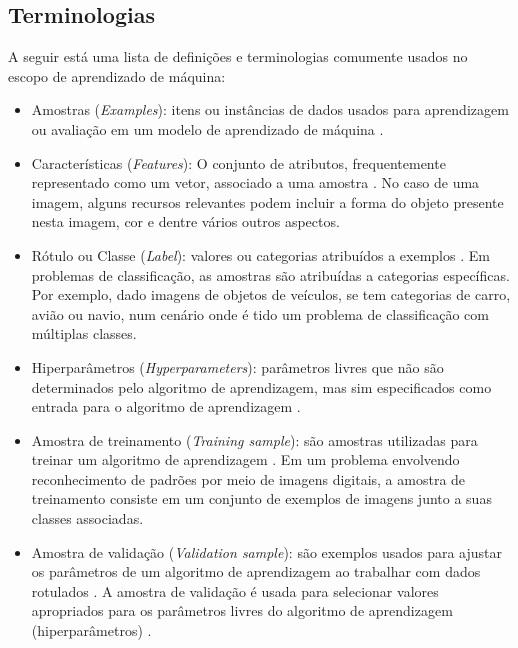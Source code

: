 \documentclass[
	12pt,				%
	oneside,			%
	a4paper,			%
	english,			%
	brazil				%
	]{abntex2ppgsi}
\begin{document}
\subsection{Terminologias}
A seguir está uma lista de definições e terminologias comumente usados no escopo de aprendizado de máquina:

\begin{itemize}
  \item Amostras (\textit{Examples}): itens ou instâncias de dados usados para aprendizagem ou avaliação em um modelo de aprendizado de máquina \cite{mohri2018foundations}.
  
  \item Características (\textit{Features}): O conjunto de atributos, frequentemente representado como um vetor, associado a uma amostra \cite{mohri2018foundations}. No caso de uma imagem, alguns recursos relevantes podem incluir a forma do objeto presente nesta imagem, cor e dentre vários outros aspectos.
  
  \item Rótulo ou Classe (\textit{Label}): valores ou categorias atribuídos a exemplos \cite{mohri2018foundations}. Em problemas de classificação, as amostras são atribuídas a categorias específicas. Por exemplo, dado imagens de objetos de veículos, se tem categorias de carro, avião ou navio, num cenário onde é tido um problema de classificação com múltiplas classes.
  
  \item Hiperparâmetros (\textit{Hyperparameters}): parâmetros livres que não são determinados pelo algoritmo de aprendizagem, mas sim especificados como entrada para o algoritmo de aprendizagem \cite{mohri2018foundations}.

  \item Amostra de treinamento (\textit{Training sample}): são amostras utilizadas para treinar um algoritmo de aprendizagem \cite{mohri2018foundations}. Em um problema envolvendo reconhecimento de padrões por meio de imagens digitais, a amostra de treinamento consiste em um conjunto de exemplos de imagens junto a suas classes associadas.

  \item Amostra de validação (\textit{Validation sample}): são exemplos usados para ajustar os parâmetros de um algoritmo de aprendizagem ao trabalhar com dados rotulados \cite{mohri2018foundations}. A amostra de validação é usada para selecionar valores apropriados para os parâmetros livres do algoritmo de aprendizagem (hiperparâmetros) \cite{mohri2018foundations}.


\end{itemize}
\end{document}
